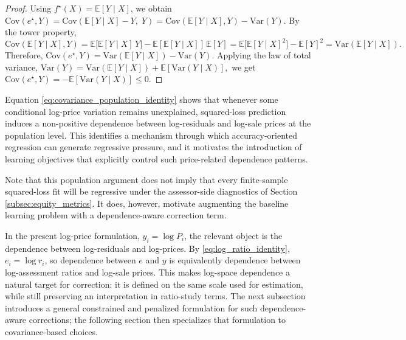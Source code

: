 \documentclass[12pt, draft]{article}
\theoremstyle{plain}
\theoremstyle{definition}
\newcommand{\E}{\mathbb{E}}
\newcommand{\1}{\mathbf{1}}
\newcommand{\Cov}{\text{Cov}}
\newcommand{\Var}{\text{Var}}
\begin{document}
{\begin{proof}
Using $f^\star(X)=\E[Y\mid X]$, we obtain
$
\Cov(e^\star,Y)
=
\Cov(\E[Y\mid X]-Y,\;Y)
=
\Cov(\E[Y\mid X],Y)-\Var(Y).
$
By the tower property,
\[
\Cov(\E[Y\mid X],Y)
=
\E\!\big[\E[Y\mid X]\,Y\big]-\E[\E[Y\mid X]]\,\E[Y]
=
\E\!\big[\E[Y\mid X]^2\big]-\E[Y]^2
=
\Var(\E[Y\mid X]).
\]
Therefore,
$
\Cov(e^\star,Y)
=
\Var(\E[Y\mid X])-\Var(Y).
$
Applying the law of total variance,
$
\Var(Y)=\Var(\E[Y\mid X])+\E[\Var(Y\mid X)],
$
we get
$
\Cov(e^\star,Y)
=
-\E[\Var(Y\mid X)]
\le 0.
$
\end{proof}

Equation \eqref{eq:covariance_population_identity} shows that whenever some conditional log-price variation remains unexplained, squared-loss prediction induces a non-positive dependence between log-residuals and log-sale prices at the population level. This identifies a mechanism through which accuracy-oriented regression can generate regressive pressure, and it motivates the introduction of learning objectives that explicitly control such price-related dependence patterns. 

Note that this population argument does not imply that every finite-sample squared-loss fit will be regressive under the assessor-side diagnostics of Section \ref{subsec:equity_metrics}. It does, however, motivate augmenting the baseline learning problem with a dependence-aware correction term.

In the present log-price formulation, $y_i=\log P_i$, the relevant object is the dependence between log-residuals and log-prices. By \eqref{eq:log_ratio_identity}, $e_i=\log r_i$, so dependence between $e$ and $y$ is equivalently dependence between log-assessment ratios and log-sale prices. This makes log-space dependence a natural target for correction: it is defined on the same scale used for estimation, while still preserving an interpretation in ratio-study terms. The next subsection introduces a general constrained and penalized formulation for such dependence-aware corrections; the following section then specializes that formulation to covariance-based choices.



}
\end{document}
